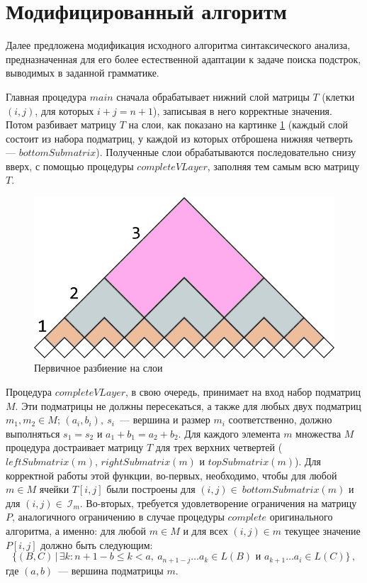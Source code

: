\documentclass[12pt]{article}  %
\theoremstyle{definition}
\theoremstyle{remark}
\begin{document}
\section{Модифицированный алгоритм}
\label{se:modification}

Далее предложена модификация исходного алгоритма синтаксического анализа, предназначенная для его более естественной адаптации к задаче поиска подстрок, выводимых в заданной грамматике.

Главная процедура $main$ сначала обрабатывает нижний слой матрицы $T$ (клетки $(i,j)$, для которых $i+j=n+1$), записывая в него корректные значения. Потом разбивает матрицу $T$ на слои, как показано на картинке \ref{gr:layers} (каждый слой состоит из набора подматриц, у каждой из которых отброшена нижняя четверть --- $bottomSubmatrix$). Полученные слои обрабатываются последовательно снизу вверх, с помощью процедуры $completeVLayer$, заполняя тем самым всю матрицу $T$.

\begin{figure}[!ht]
  \centering
    \includegraphics[width=0.9\linewidth]{layers.png}
  \caption{Первичное разбиение на слои}
  \label{gr:layers}
\end{figure}


Процедура $completeVLayer$, в свою очередь, принимает на вход набор подматриц $M$. Эти подматрицы не должны пересекаться, а также для любых двух подматриц $m_1, m_2 \in M$; $(a_i,b_i),\ s_i$~--- вершина и размер $m_i$ соответственно, должно выполняться $s_1 = s_2$ и $a_1 + b_1 = a_2 + b_2$. Для каждого элемента $m$ множества $M$ процедура достраивает матрицу $T$ для трех верхних четвертей ($leftSubmatrix(m)$, $rightSubmatrix(m)$ и $topSubmatrix(m)$). Для корректной работы этой функции, во-первых, необходимо, чтобы для любой $m \in M$ ячейки $T[i,j]$ были построены  для $(i,j) \in\ bottomSubmatrix(m)$ и для $(i,j) \in\ \mathcal{I}_m$. Во-вторых, требуется удовлетворение ограничения на матрицу $P$, аналогичного ограничению в случае процедуры $complete$ оригинального алгоритма, а именно: для любой $m \in M$ и для всех $(i,j) \in m$ текущее значение $P[i,j]$ должно быть следующим:
$$\{(B,C)\,|\,\exists k: n + 1 - b \leqslant k < a,\ a_{n+1-j}\dots a_k \in L(B) \mbox{ и } a_{k+1}\dots a_i \in L(C)\}\,,$$
где $(a,b)$~--- вершина подматрицы $m$.
\end{document}

